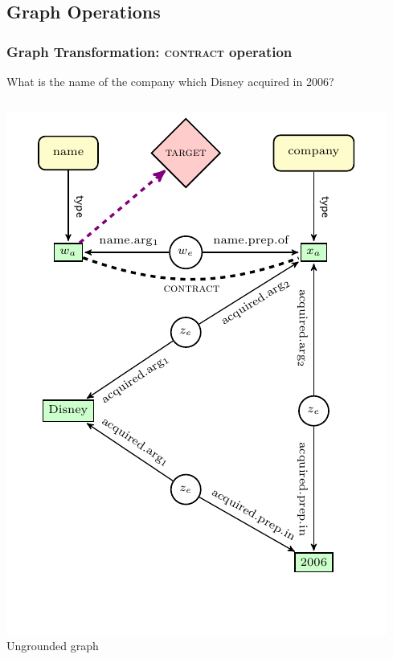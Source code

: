 \documentclass[mathserif,12pt]{beamer}
\newcommand{\hlight}[1]{{\color{blue!80} #1}}
\newcommand \contract{\textsc{contract}\xspace}
\begin{document}
\subsection{Graph Operations}
\begin{frame}[noframenumbering]
\frametitle{Graph Transformation: \contract operation}

\begin{center}
  What is the \hlight{name of the company} which Disney acquired in 2006?
\end{center}

\begin{columns}
  \begin{column}{0.35\textwidth}
   \centering
   \includegraphics[width=\textwidth]{figures/question_unmerged_ungrounded_graph} \\
   \small Ungrounded graph
  \end{column}
  \begin{column}{0.35\textwidth}

\end{column}
\end{columns}
\end{frame}
\end{document}
